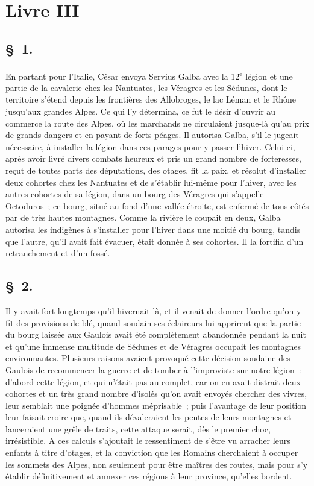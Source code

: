 \documentclass[french,twoside]{book} %
\begin{document}
 \section[{Livre III}]{Livre III}\renewcommand{\leftmark}{Livre III}

\subsection[{§ 1.}]{ \textsc{§ 1.} }
\noindent En partant pour l’Italie, César envoya Servius Galba avec la 12\textsuperscript{e} légion et une partie de la cavalerie chez les Nantuates, les Véragres et les Sédunes, dont le territoire s’étend depuis les frontières des Allobroges, le lac Léman et le Rhône jusqu’aux grandes Alpes. Ce qui l’y détermina, ce fut le désir d’ouvrir au commerce la route des Alpes, où les marchands ne circulaient jusque-là qu’au prix de grands dangers et en payant de forts péages. Il autorisa Galba, s’il le jugeait nécessaire, à installer la légion dans ces parages pour y passer l’hiver. Celui-ci, après avoir livré divers combats heureux et pris un grand nombre de forteresses, reçut de toutes parts des députations, des otages, fit la paix, et résolut d’installer deux cohortes chez les Nantuates et de s’établir lui-même pour l’hiver, avec les autres cohortes de sa légion, dans un bourg des Véragres qui s’appelle Octoduros ; ce bourg, situé au fond d’une vallée étroite, est enfermé de tous côtés par de très hautes montagnes. Comme la rivière le coupait en deux, Galba autorisa les indigènes à s’installer pour l’hiver dans une moitié du bourg, tandis que l’autre, qu’il avait fait évacuer, était donnée à ses cohortes. Il la fortifia d’un retranchement et d’un fossé.
\subsection[{§ 2.}]{ \textsc{§ 2.} }
\noindent Il y avait fort longtemps qu’il hivernait là, et il venait de donner l’ordre qu’on y fît des provisions de blé, quand soudain ses éclaireurs lui apprirent que la partie du bourg laissée aux Gaulois avait été complètement abandonnée pendant la nuit et qu’une immense multitude de Sédunes et de Véragres occupait les montagnes environnantes. Plusieurs raisons avaient provoqué cette décision soudaine des Gaulois de recommencer la guerre et de tomber à l’improviste sur notre légion : d’abord cette légion, et qui n’était pas au complet, car on en avait distrait deux cohortes et un très grand nombre d’isolés qu’on avait envoyés chercher des vivres, leur semblait une poignée d’hommes méprisable ; puis l’avantage de leur position leur faisait croire que, quand ils dévaleraient les pentes de leurs montagnes et lanceraient une grêle de traits, cette attaque serait, dès le premier choc, irrésistible. A ces calculs s’ajoutait le ressentiment de s’être vu arracher leurs enfants à titre d’otages, et la conviction que les Romains cherchaient à occuper les sommets des Alpes, non seulement pour être maîtres des routes, mais pour s’y établir définitivement et annexer ces régions à leur province, qu’elles bordent.
\end{document}
